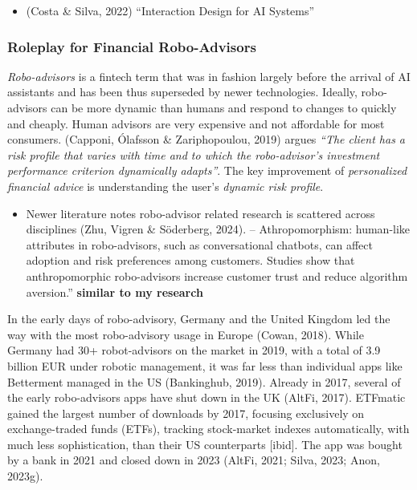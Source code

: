 \documentclass[
  letterpaper,
  DIV=11,
  numbers=noendperiod]{scrartcl}
\providecommand{\tightlist}{%
  \setlength{\itemsep}{0pt}\setlength{\parskip}{0pt}}\usepackage{longtable,booktabs,array}
\begin{document}
\begin{itemize}
\tightlist
\item
  (Costa \& Silva, 2022) ``Interaction Design for AI Systems''
\end{itemize}

\subsubsection{Roleplay for Financial
Robo-Advisors}\label{roleplay-for-financial-robo-advisors}

\emph{Robo-advisors} is a fintech term that was in fashion largely
before the arrival of AI assistants and has been thus superseded by
newer technologies. Ideally, robo-advisors can be more dynamic than
humans and respond to changes to quickly and cheaply. Human advisors are
very expensive and not affordable for most consumers. (Capponi, Ólafsson
\& Zariphopoulou, 2019) argues \emph{``The client has a risk profile
that varies with time and to which the robo-advisor's investment
performance criterion dynamically adapts''}. The key improvement of
\emph{personalized financial advice} is understanding the user's
\emph{dynamic risk profile}.

\begin{itemize}
\tightlist
\item
  Newer literature notes robo-advisor related research is scattered
  across disciplines (Zhu, Vigren \& Söderberg, 2024). --
  Athropomorphism: human-like attributes in robo-advisors, such as
  conversational chatbots, can affect adoption and risk preferences
  among customers. Studies show that anthropomorphic robo-advisors
  increase customer trust and reduce algorithm aversion.''
  \textbf{similar to my research}
\end{itemize}

In the early days of robo-advisory, Germany and the United Kingdom led
the way with the most robo-advisory usage in Europe (Cowan, 2018). While
Germany had 30+ robot-advisors on the market in 2019, with a total of
3.9 billion EUR under robotic management, it was far less than
individual apps like Betterment managed in the US (Bankinghub, 2019).
Already in 2017, several of the early robo-advisors apps have shut down
in the UK (AltFi, 2017). ETFmatic gained the largest number of downloads
by 2017, focusing exclusively on exchange-traded funds (ETFs), tracking
stock-market indexes automatically, with much less sophistication, than
their US counterparts {[}ibid{]}. The app was bought by a bank in 2021
and closed down in 2023 (AltFi, 2021; Silva, 2023; Anon, 2023g).
\end{document}
